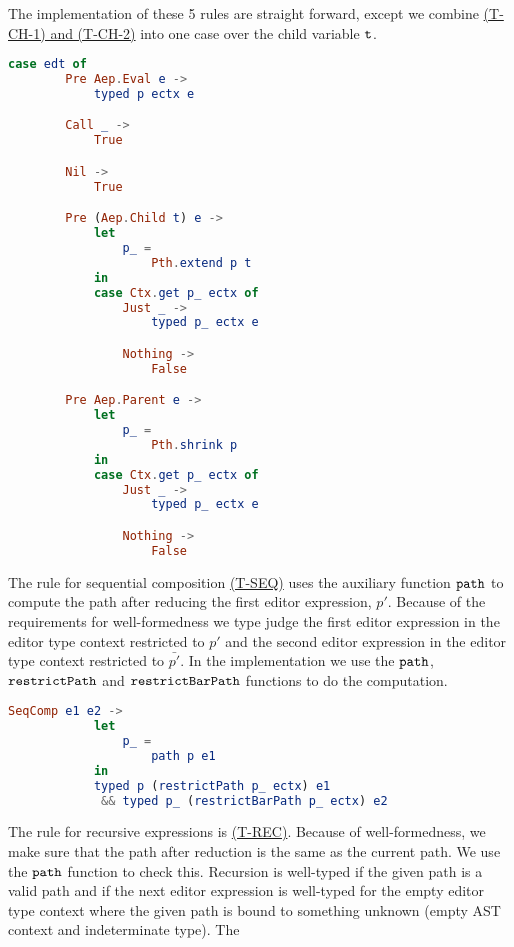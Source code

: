 The implementation of these 5 rules are straight forward, except we combine
\hyperref[fig:asttyperules]{(T-CH-1) and (T-CH-2)} into one case over the child
variable $\texttt{t}$.
\begin{lstlisting}[language=elm,%
    gobble=4,%
    ]
    case edt of
        Pre Aep.Eval e ->
            typed p ectx e

        Call _ ->
            True

        Nil ->
            True

        Pre (Aep.Child t) e ->
            let
                p_ =
                    Pth.extend p t
            in
            case Ctx.get p_ ectx of
                Just _ ->
                    typed p_ ectx e

                Nothing ->
                    False

        Pre Aep.Parent e ->
            let
                p_ =
                    Pth.shrink p
            in
            case Ctx.get p_ ectx of
                Just _ ->
                    typed p_ ectx e

                Nothing ->
                    False
\end{lstlisting}
The rule for sequential composition \hyperref[fig:asttyperules]{(T-SEQ)} uses
the auxiliary function $\texttt{path}$ to compute the path after reducing the first
editor expression, $p'$. Because of the requirements for well-formedness we type
judge the first editor expression in the editor type context restricted to $p'$
and the second editor expression in the editor type context restricted to
$\bar{p'}$. In the implementation we use the $\texttt{path}$, $\texttt{restrictPath}$
and $\texttt{restrictBarPath}$ functions to do the computation.
\begin{lstlisting}[language=elm,%
    gobble=8,%
    ]
        SeqComp e1 e2 ->
            let
                p_ =
                    path p e1
            in
            typed p (restrictPath p_ ectx) e1
             && typed p_ (restrictBarPath p_ ectx) e2
\end{lstlisting}
The rule for recursive expressions is \hyperref[fig:asttyperules]{(T-REC)}.
Because of well-formedness, we make sure that the path after reduction is the
same as the current path. We use the $\texttt{path}$ function to check this.
Recursion is well-typed if the given path is a valid path and if the next editor
expression is well-typed for the empty editor type context where the given path
is bound to something unknown (empty AST context and indeterminate type). The

